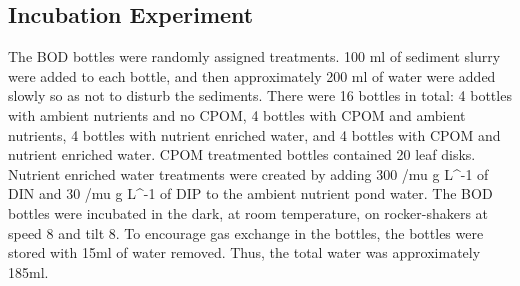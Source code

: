 \subsection{Incubation Experiment}
The BOD bottles were randomly assigned treatments. 100 ml of sediment slurry were added to each bottle, and then approximately 200 ml of water were added slowly so as not to disturb the sediments. There were 16 bottles in total: 4 bottles with ambient nutrients and no CPOM, 4 bottles with CPOM and ambient nutrients, 4 bottles with nutrient enriched water, and 4 bottles with CPOM and nutrient enriched water. CPOM treatmented bottles contained 20 leaf disks. Nutrient enriched water treatments were created by adding 300 /mu g L^-1 of DIN and 30 /mu g L^-1 of DIP to the ambient nutrient pond water. The BOD bottles were incubated in the dark, at room temperature, on rocker-shakers at speed 8 and tilt 8. To encourage gas exchange in the bottles, the bottles were stored with 15ml of water removed. Thus, the total water was approximately 185ml. 